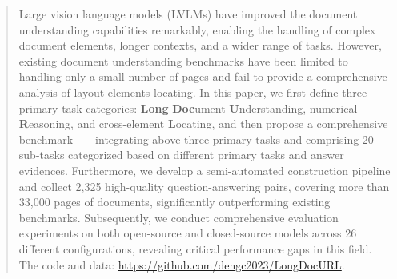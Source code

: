 \begin{abstract}
\label{sec:abstract}
Large vision language models (LVLMs) have improved the document understanding capabilities remarkably, enabling the handling of complex document elements, longer contexts, and a wider range of tasks. However, existing document understanding benchmarks have been limited to handling only a small number of pages and fail to provide a comprehensive analysis of layout elements locating. In this paper, we first define three primary task categories: \textbf{Long} \textbf{Doc}ument \textbf{U}nderstanding, numerical \textbf{R}easoning, and cross-element \textbf{L}ocating, and then propose a comprehensive benchmark—\textbf{\benchName}—integrating above three primary tasks and comprising 20 sub-tasks categorized based on different primary tasks and answer evidences. Furthermore, we develop a semi-automated construction pipeline and collect 2,325 high-quality question-answering pairs, covering more than 33,000 pages of documents, significantly outperforming existing benchmarks. Subsequently, we conduct comprehensive evaluation experiments on both open-source and closed-source models across 26 different configurations, revealing critical performance gaps in this field. The code and data: \url{https://github.com/dengc2023/LongDocURL}.

\end{abstract}